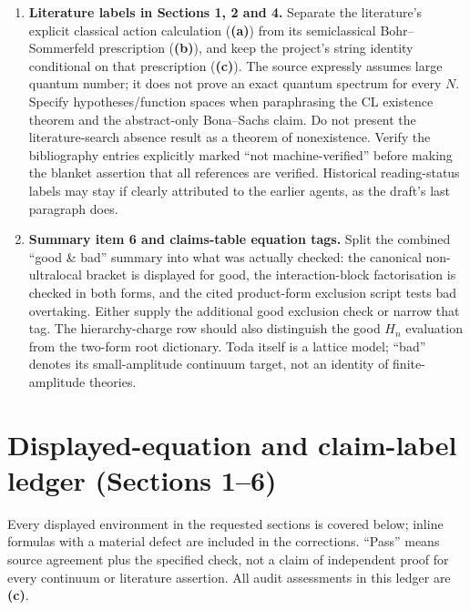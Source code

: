 \documentclass[11pt,a4paper]{article}
\newcommand{\A}{\textsf{\textbf{(a)}}}
\newcommand{\B}{\textsf{\textbf{(b)}}}
\newcommand{\C}{\textsf{\textbf{(c)}}}
\begin{document}
\begin{enumerate}[label=R\arabic*.,leftmargin=*,itemsep=8pt]
\item \textbf{Literature labels in Sections 1, 2 and 4.}
Separate the literature's explicit classical action calculation (\A)
from its semiclassical Bohr--Sommerfeld prescription (\B), and keep the
project's string identity conditional on that prescription (\C).
The source expressly assumes large quantum number; it does not prove an
exact quantum spectrum for every $N$. Specify hypotheses/function spaces
when paraphrasing the CL existence theorem and the abstract-only
Bona--Sachs claim. Do not present the literature-search absence result as
a theorem of nonexistence. Verify the bibliography entries explicitly
marked ``not machine-verified'' before making the blanket assertion that
all references are verified. Historical reading-status labels may stay if
clearly attributed to the earlier agents, as the draft's last paragraph does.

\item \textbf{Summary item 6 and claims-table equation tags.}
Split the combined ``good \& bad'' summary into what was actually checked:
the canonical non-ultralocal bracket is displayed for good, the
interaction-block factorisation is checked in both forms, and the cited
product-form exclusion script tests bad overtaking. Either supply the
additional good exclusion check or narrow that tag. The hierarchy-charge
row should also distinguish the good $H_n$ evaluation from the two-form
root dictionary. Toda itself is a lattice model; ``bad'' denotes its
small-amplitude continuum target, not an identity of finite-amplitude
theories.
\end{enumerate}

\section*{Displayed-equation and claim-label ledger (Sections 1--6)}
Every displayed environment in the requested sections is covered below;
inline formulas with a material defect are included in the corrections.
``Pass'' means source agreement plus the specified check, not a claim of
independent proof for every continuum or literature assertion. All audit
assessments in this ledger are \C.
\end{document}
